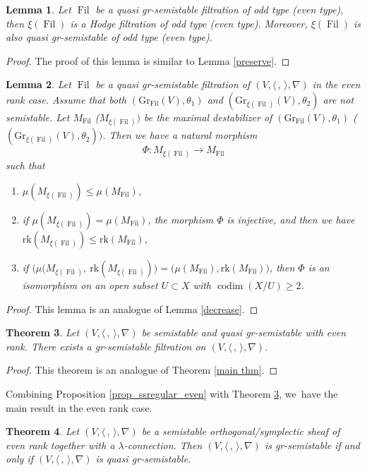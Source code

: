 \documentclass[JEP,XML,SOM,Unicode,published]{cedram}
\newcommand{\lconnection}{$\lambda$\nobreakdash-con\-nec\-tion\xspace}
\newcommand{\grsemistable}{gr\nobreakdash-semi\-stable\xspace}
\DeclareMathOperator{\codim}{codim}
\DeclareMathOperator{\Filt}{Fil}
\newcommand{\rk}{\mathrm{rk}}
\newcommand{\Gr}{\mathrm{Gr}}
\theoremstyle{plain}
\newtheorem{thm}{Theorem}[section]
\newtheorem{lem}[thm]{Lemma}
\theoremstyle{definition}
\begin{document}
\begin{lem}
Let $\Filt$ be a quasi \grsemistable filtration of odd type (\resp even type), then $\xi(\Filt)$ is a Hodge filtration of odd type (\resp even type). Moreover, $\xi(\Filt)$ is also quasi \grsemistable of odd type (\resp even type).
\end{lem}

\begin{proof}
The proof of this lemma is similar to Lemma \ref{preserve}.
\end{proof}

\begin{lem}
Let $\Filt$ be a quasi \grsemistable filtration of $(V,\langle \,, \, \rangle,\nabla)$ in the even rank case. Assume that both $(\Gr_{\Filt}(V),\theta_1)$ and $(\Gr_{\xi(\Filt)}(V),\theta_2)$ are not semistable. Let $M_{\Filt}$ (\resp $M_{\xi(\Filt)})$ be the maximal destabilizer of $(\Gr_{\Filt}(V),\theta_1)$ (\resp $(\Gr_{\xi(\Filt)}(V),\theta_2))$. Then we have a natural morphism
\[
\Phi: M_{\xi(\Filt)}\to M_{\Filt}
\]
such that
\begin{enumerate}
\item $\mu(M_{\xi(\Filt)})\leq \mu(M_{\Filt})$,

\item if $\mu(M_{\xi(\Filt)})= \mu(M_{\Filt})$, the morphism $\Phi$ is injective, and then we have $\rk(M_{\xi(\Filt)})\leq\rk(M_{\Filt})$,

\item if $\big(\mu(M_{\xi(\Filt)},\ \rk(M_{\xi(\Filt)})\big)= \big(\mu(M_{\Filt}),\rk(M_{\Filt})\big)$, then $\Phi$ is an isomorphism on an open subset $U \subset X$ with $\codim(X/U) \geq 2$.
\end{enumerate}
\end{lem}

\begin{proof}
This lemma is an analogue of Lemma \ref{decrease}.
\end{proof}

\begin{thm}\label{main thm even}
Let $(V,\langle \,, \, \rangle,\nabla)$ be semistable and quasi \grsemistable with even rank. There exists a \grsemistable filtration on $(V,\langle \,, \, \rangle,\nabla)$.
\end{thm}

\begin{proof}
This theorem is an analogue of Theorem \ref{main thm}.
\end{proof}

Combining Proposition \ref{prop_ssregular_even} with Theorem \ref{main thm even}, we~have the main result in the even rank case.
\begin{thm}\label{thm_even}
Let $(V,\langle \,, \, \rangle,\nabla)$ be a semistable orthogonal/symplectic sheaf of even rank together with a \lconnection. Then $(V,\langle \,, \, \rangle,\nabla)$ is \grsemistable if and only if $(V,\langle \,, \, \rangle,\nabla)$ is quasi \grsemistable.
\end{thm}
\end{document}

